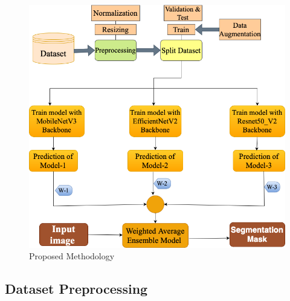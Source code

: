 \begin{figure}[H]
\centering
\includegraphics[width= 1\textwidth]{figs/ensemble.png}
\caption{Proposed Methodology}
\label{metho2}
\end{figure}



\subsection{Dataset Preprocessing}



